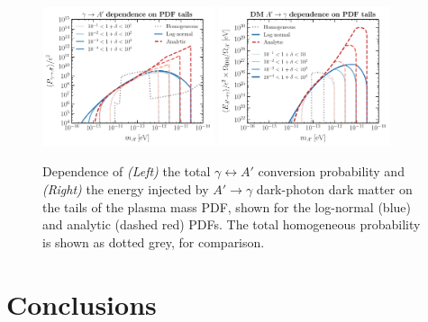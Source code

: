 \documentclass[prd,aps,10pt,nofootinbib,twocolumn,superscriptaddress,preprintnumbers,balancelastpage,longbibliography]{revtex4-1}
\begin{document}
%
\begin{figure}[htbp]
    \centering
    \includegraphics[width=0.45\textwidth]{plots/P_tot_m_Ap_tails}
    \includegraphics[width=0.45\textwidth]{plots/energy_per_baryon_delta_var}
    \caption{Dependence of \emph{(Left)} the total $\gamma\leftrightarrow A'$ conversion probability and \emph{(Right)} the energy injected by $A' \to \gamma$ dark-photon dark matter on the tails of the plasma mass PDF, shown for the log-normal (blue) and analytic (dashed red) PDFs. The total homogeneous probability is shown as dotted grey, for comparison.~~} 
    \label{fig:P_tot_m_Ap_tails}
\end{figure}
%

\section{Conclusions}
\label{sec:conclusion}
\end{document}
